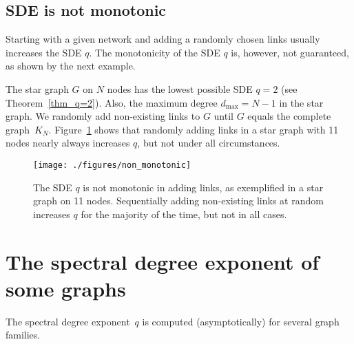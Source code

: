 \documentclass{comnet}%
\begin{document}
\subsection{SDE is not monotonic}
Starting with a given network and adding a randomly chosen links usually increases the SDE $q$. The monotonicity of the SDE $q$ is, however, not guaranteed, as shown by the next example.

The star graph $G$ on $N$ nodes has the lowest possible SDE $q=2$ (see Theorem~\ref{thm_q=2}). Also, the maximum degree $d_{\max}=N-1$ in the star graph. We randomly add non-existing links to $G$ until $G$ equals the complete graph~$K_N$. Figure~\ref{fig_q_non_monotonic} shows that randomly adding links in a star graph with 11 nodes nearly always increases $q$, but not under all circumstances.

\begin{figure}[!ht]
	\centering
	\texttt{[image: ./figures/non\_monotonic]}
	\caption{The SDE $q$ is not monotonic in adding links, as exemplified in a star graph on 11 nodes. Sequentially adding non-existing links at random increases $q$ for the majority of the time, but not in all cases.}
	\label{fig_q_non_monotonic}
\end{figure}



\section{The spectral degree exponent of some graphs}\label{sec_special_cases}
The spectral degree exponent~$q$ is computed (asymptotically) for several graph families.
\end{document}
